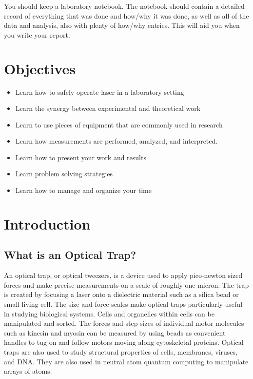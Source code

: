 \documentclass{../lab}
\begin{document}
You should keep a laboratory notebook. The notebook should contain a detailed record of everything that was done and how/why it was done, as well as all of the data and analysis, also with plenty of how/why entries. This will aid you when you write your report.

\section{Objectives}

\begin{itemize}
    \item Learn how to safely operate laser in a laboratory setting

    \item Learn the synergy between experimental and theoretical work

    \item Learn to use pieces of equipment that are commonly used in research

    \item Learn how measurements are performed, analyzed, and interpreted.

    \item Learn how to present your work and results

    \item Learn problem solving strategies

    \item Learn how to manage and organize your time
\end{itemize}

\section{Introduction}

\subsection{What is an Optical Trap?}

An optical trap, or optical tweezers, is a device used to apply pico-newton sized forces and make precise measurements on a scale of roughly one micron. The trap is created by focusing a laser onto a dielectric material such as a silica bead or small living cell. The size and force scales make optical traps particularly useful in studying biological systems. Cells and organelles within cells can be manipulated and sorted. The forces and step-sizes of individual motor molecules such as kinesin and myosin can be measured by using beads as convenient handles to tug on and follow motors moving along cytoskeletal proteins. Optical traps are also used to study structural properties of cells, membranes, viruses, and DNA. They are also used in neutral atom quantum computing to manipulate arrays of atoms.
\end{document}
